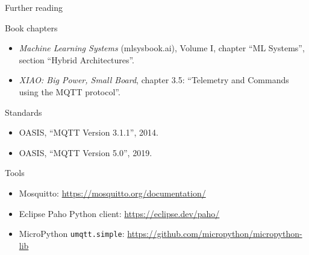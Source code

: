 \begin{frame}{Further reading}
  \footnotesize
  \begin{block}{Book chapters}
    \begin{itemize}
      \item \emph{Machine Learning Systems} (mlsysbook.ai), Volume I, chapter
            ``ML Systems'', section ``Hybrid Architectures''.
      \item \emph{XIAO: Big Power, Small Board}, chapter 3.5: ``Telemetry and
            Commands using the MQTT protocol''.
    \end{itemize}
  \end{block}
  \begin{block}{Standards}
    \begin{itemize}
      \item OASIS, ``MQTT Version 3.1.1'', 2014.
      \item OASIS, ``MQTT Version 5.0'', 2019.
    \end{itemize}
  \end{block}
  \begin{block}{Tools}
    \begin{itemize}
      \item Mosquitto: \url{https://mosquitto.org/documentation/}
      \item Eclipse Paho Python client: \url{https://eclipse.dev/paho/}
      \item MicroPython \texttt{umqtt.simple}:
            \url{https://github.com/micropython/micropython-lib}
    \end{itemize}
  \end{block}
\end{frame}
